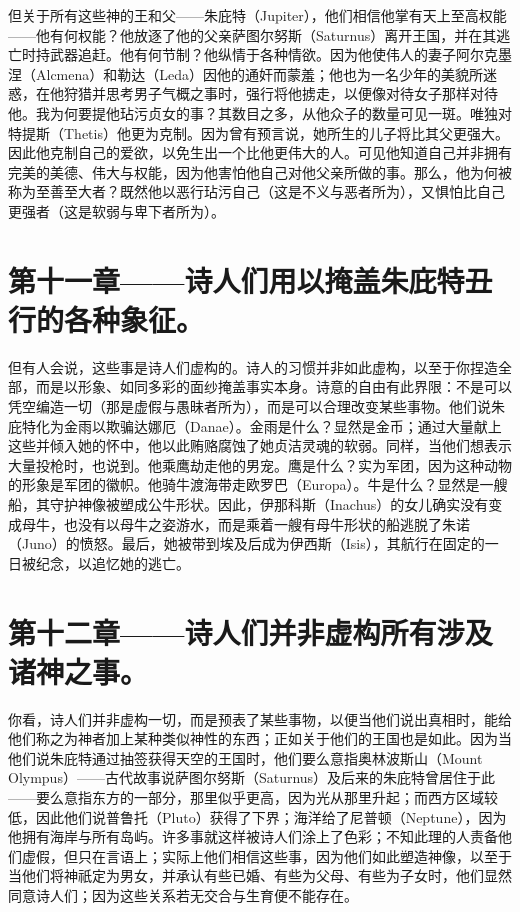 但关于所有这些神的王和父——朱庇特（Jupiter），他们相信他掌有天上至高权能——他有何权能？他放逐了他的父亲萨图尔努斯（Saturnus）离开王国，并在其逃亡时持武器追赶。他有何节制？他纵情于各种情欲。因为他使伟人的妻子阿尔克墨涅（Alcmena）和勒达（Leda）因他的通奸而蒙羞；他也为一名少年的美貌所迷惑，在他狩猎并思考男子气概之事时，强行将他掳走，以便像对待女子那样对待他。我为何要提他玷污贞女的事？其数目之多，从他众子的数量可见一斑。唯独对特提斯（Thetis）他更为克制。因为曾有预言说，她所生的儿子将比其父更强大。因此他克制自己的爱欲，以免生出一个比他更伟大的人。可见他知道自己并非拥有完美的美德、伟大与权能，因为他害怕他自己对他父亲所做的事。那么，他为何被称为至善至大者？既然他以恶行玷污自己（这是不义与恶者所为），又惧怕比自己更强者（这是软弱与卑下者所为）。\par


\section{第十一章——诗人们用以掩盖朱庇特丑行的各种象征。}

但有人会说，这些事是诗人们虚构的。诗人的习惯并非如此虚构，以至于你捏造全部，而是以形象、如同多彩的面纱掩盖事实本身。诗意的自由有此界限：不是可以凭空编造一切（那是虚假与愚昧者所为），而是可以合理改变某些事物。他们说朱庇特化为金雨以欺骗达娜厄（Danae）。金雨是什么？显然是金币；通过大量献上这些并倾入她的怀中，他以此贿赂腐蚀了她贞洁灵魂的软弱。同样，当他们想表示大量投枪时，也说到。他乘鹰劫走他的男宠。鹰是什么？实为军团，因为这种动物的形象是军团的徽帜。他骑牛渡海带走欧罗巴（Europa）。牛是什么？显然是一艘船，其守护神像被塑成公牛形状。因此，伊那科斯（Inachus）的女儿确实没有变成母牛，也没有以母牛之姿游水，而是乘着一艘有母牛形状的船逃脱了朱诺（Juno）的愤怒。最后，她被带到埃及后成为伊西斯（Isis），其航行在固定的一日被纪念，以追忆她的逃亡。\par


\section{第十二章——诗人们并非虚构所有涉及诸神之事。}

你看，诗人们并非虚构一切，而是预表了某些事物，以便当他们说出真相时，能给他们称之为神者加上某种类似神性的东西；正如关于他们的王国也是如此。因为当他们说朱庇特通过抽签获得天空的王国时，他们要么意指奥林波斯山（Mount Olympus）——古代故事说萨图尔努斯（Saturnus）及后来的朱庇特曾居住于此——要么意指东方的一部分，那里似乎更高，因为光从那里升起；而西方区域较低，因此他们说普鲁托（Pluto）获得了下界；海洋给了尼普顿（Neptune），因为他拥有海岸与所有岛屿。许多事就这样被诗人们涂上了色彩；不知此理的人责备他们虚假，但只在言语上；实际上他们相信这些事，因为他们如此塑造神像，以至于当他们将神祇定为男女，并承认有些已婚、有些为父母、有些为子女时，他们显然同意诗人们；因为这些关系若无交合与生育便不能存在。\par


